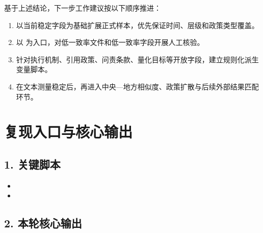 基于上述结论，下一步工作建议按以下顺序推进：

\begin{enumerate}
\def\labelenumi{\arabic{enumi}.}
\tightlist
\item
  以当前稳定字段为基础扩展正式样本，优先保证时间、层级和政策类型覆盖。
\item
  以 
  为入口，对低一致率文件和低一致率字段开展人工核验。
\item
  针对执行机制、引用政策、问责条款、量化目标等开放字段，建立规则化派生变量脚本。
\item
  在文本测量稳定后，再进入中央---地方相似度、政策扩散与后续外部结果匹配环节。
\end{enumerate}

\clearpage
\appendix
\section{复现入口与核心输出}

\subsection{1. 关键脚本}

\begin{itemize}
\tightlist
\item
\item
\end{itemize}

\subsection{2.
本轮核心输出}

